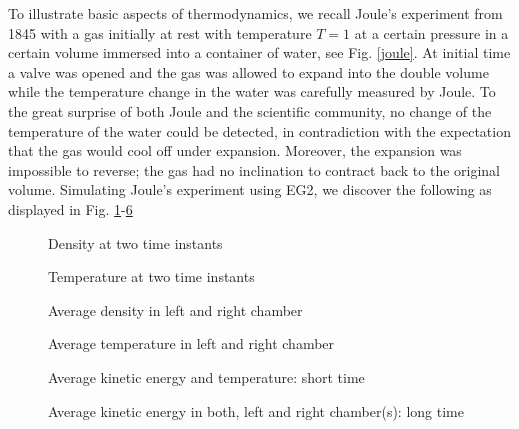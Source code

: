 To illustrate basic aspects of thermodynamics, we recall Joule's
experiment from 1845 with a gas initially at rest with temperature $T
=1$ at a certain pressure in a certain volume immersed into a
container of water, see Fig. \ref{joule}. At initial time a valve was
opened and the gas was allowed to expand into the double volume while
the temperature change in the water was carefully measured by Joule.
To the great surprise of both Joule and the scientific community, no
change of the temperature of the water could be detected, in
contradiction with the expectation that the gas would cool off under
expansion.  Moreover, the expansion was impossible to reverse; the gas
had no inclination to contract back to the original volume.
Simulating Joule's experiment using EG2, we discover the following as
displayed in Fig. \ref{joule_den}-\ref{joule_kin2}

\begin{figure}[bhpt] 
\centerline{ 
} 
\caption{Density at two time instants}
\label{joule_den} 
\end{figure}
\begin{figure}[bhpt] 
\centerline{ 
} 
\caption{Temperature at two time instants}
\label{joule_tem} 
\end{figure}

\begin{figure}[bhpt] 
\centerline{ 
} 
\caption{Average density in left and right chamber}
\label{joule_den2} 
\end{figure}

\begin{figure}[bhpt] 
\centerline{ 
} 
\caption{Average temperature in left and right chamber}
\label{joule_tem2} 
\end{figure}

\begin{figure}[bhpt] 
\centerline{ 
} 
\caption{Average kinetic energy and temperature: short time}
\label{joule_kin} 
\end{figure}
\begin{figure}[bhpt] 
\centerline{
} 
\caption{Average kinetic energy in both, left and right chamber(s): long time}
\label{joule_kin2} 
\end{figure}

